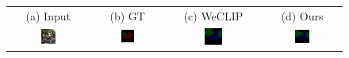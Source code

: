 \begin{figure}[ht]
  \centering
  \setlength{\tabcolsep}{2pt} %
  \renewcommand{\arraystretch}{0.9}
  \begin{tcolorbox}[colframe=black!60, colback=white, boxrule=0.8pt, arc=2pt, left=2pt, right=2pt, top=2pt, bottom=2pt]
    \centering
    \begin{tabular}{cccc}
      (a) Input & (b) GT & (c) WeCLIP & (d) Ours           \\
      [1mm]

      \includegraphics[width=0.20\textwidth,height=0.20\textwidth]
      {figures/originals/2007_003778.jpg}
                &
      \includegraphics[width=0.20\textwidth,height=0.20\textwidth]
      {figures/colored_gts/2007_003778.png}
                &
      \includegraphics[width=0.20\textwidth,height=0.20\textwidth]
      {figures/val_labels/weclip/2007_003778_[7, 15].png}
                &
      \includegraphics[width=0.20\textwidth,height=0.20\textwidth]
      {figures/val_labels/ours/2007_003778_[7, 15].png}    \\


\end{tabular}
\end{tcolorbox}
\end{figure}
